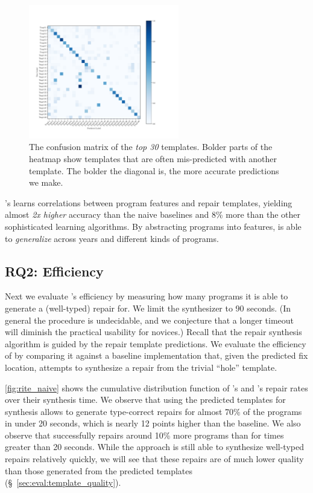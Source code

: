 \begin{figure}[t]
  \centering
  \includegraphics[trim={30 40 100 70},clip,height=2.3in]{evaluation-conf-matrix-no-title.pdf}
  \caption{The confusion matrix of the \emph{top 30} templates. Bolder parts of
  the heatmap show templates that are often mis-predicted with another template.
  The bolder the diagonal is, the more accurate predictions we make.}
  \label{fig:conf-matrix}
\end{figure}

\begin{framed}
  \noindent \toolname's learns correlations between program features and repair
  templates, yielding almost \emph{2x higher} accuracy than the naive baselines
  and 8\% more than the other sophisticated learning algorithms. By abstracting
  programs into features, \toolname is able to \emph{generalize} across years
  and different kinds of programs.
\end{framed}


\subsection{RQ2: Efficiency}
\label{sec:eval:efficiency}
\label{subsec:eval:man_rep_qual_eval}

Next we evaluate \toolname's efficiency by measuring how many programs it is
able to generate a (well-typed) repair for.
%
We limit the synthesizer to 90 seconds. (In general the procedure is
undecidable, and we conjecture that a longer timeout will diminish the practical
usability for novices.)
%
Recall that the repair synthesis algorithm is guided by the repair template
predictions.
%
We evaluate the efficiency of \toolname by comparing it against a baseline
\naive implementation that, given the predicted fix location, attempts to
synthesize a repair from the trivial ``hole'' template.

\autoref{fig:rite_naive} shows the cumulative distribution function of
\toolname's and \naive's repair rates over their synthesis time. We observe that
using the predicted templates for synthesis allows \toolname to generate
type-correct repairs for almost 70\% of the programs in under 20 seconds, which
is nearly 12 points higher than the \naive baseline. We also observe that
\toolname successfully repairs around 10\% more programs than \naive for times
greater than 20 seconds. While the \naive approach is still able to synthesize
well-typed repairs relatively quickly, we will see that these repairs are of
much lower quality than those generated from the predicted templates
(\S~\ref{sec:eval:template_quality}).

